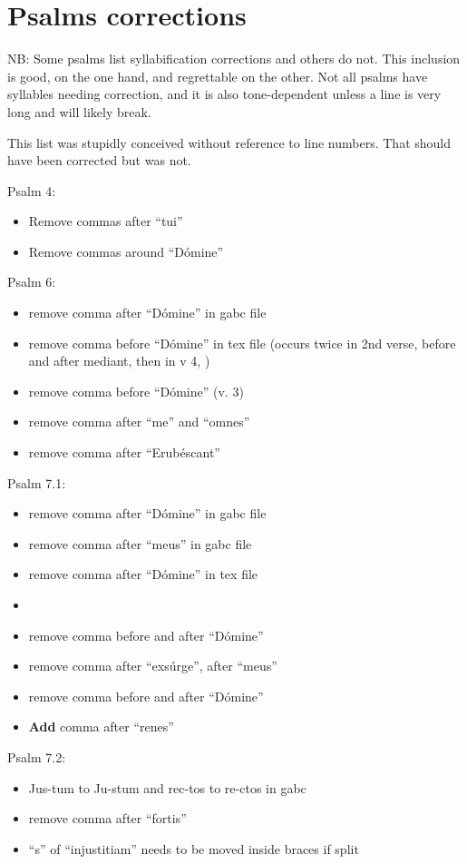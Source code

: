 \documentclass[11pt]{article}
\begin{document}
\section{Psalms corrections}

NB: Some psalms list syllabification corrections and others do not. This inclusion is good, on the one hand, and regrettable on the other. Not all psalms have syllables needing correction, and it is also tone-dependent unless a line is very long and will likely break.

This list was stupidly conceived without reference to line numbers. That should have been corrected but was not.

 Psalm 4:
  \begin{itemize}
  \item   Remove commas after ``tui''
    \item Remove commas around ``Dómine''
    \end{itemize}

 Psalm 6:
  \begin{itemize}
  \item remove comma after ``Dómine'' in gabc file 
  \item  remove comma before ``Dómine'' in tex file (occurs twice in 2nd verse, before and after mediant, then in v 4, )
  \item
   remove comma before ``Dómine''  (v. 3)
   \item
   remove comma after ``me'' and ``omnes''
  \item
 remove comma after ``Erubéscant''
    \end{itemize}

 Psalm 7.1:
  \begin{itemize}
  \item remove comma after ``Dómine'' in gabc file 
  \item  remove comma after ``meus'' in gabc file 
  \item  remove comma after ``Dómine'' in tex file  \item
\item   remove comma before and after ``Dómine''
   \item
   remove comma after ``exsúrge'',  after ``meus'' 
   \item   remove comma before and after ``Dómine''
   \item
   \textbf{Add} comma after ``renes''
    \end{itemize}

 Psalm 7.2:
  \begin{itemize}
  \item Jus-tum to Ju-stum and rec-tos to re-ctos in gabc
  \item  remove comma after ``fortis''
  \item
  ``s'' of ``injustitiam'' needs to be moved inside braces if split
    \end{itemize}
\end{document}
